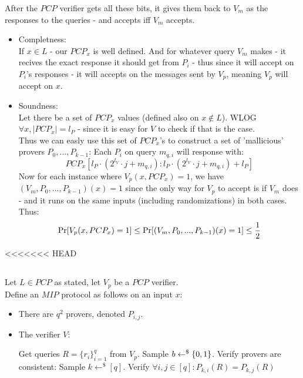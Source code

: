 After the $PCP$ verifier gets all these bits,
it gives them back to $V_m$ as the responses to the queries -
and accepts iff $V_m$ accepts.\\

\begin{itemize}
	\item Completness:\\
	If $x\in L$ - our $PCP_x$ is well defined.
	And for whatever query $V_m$ makes - it recives the exact
	response it should get from $P_i$ - thus since it will accept
	on $P_i$'s responses - it will accepts on the messages sent by $V_p$,
	meaning $V_p$ will accept on $x$.
	\item Soundness:\\
	Let there be a set of $PCP_x$ values (defined also on $x\notin L$).
	WLOG $\forall x,|PCP_x|=l_P$ - since it is easy for $V$ to check if that is the case.\\
	Thus we can easly use this set of $PCP_x$'s to
	construct a set of 'mallicious' provers $P_0,...,P_{k-1}$:
	Each $P_i$ on query $m_{q,i}$ will response with:
	\[
		PCP_x[l_P\cdot(2^{l_V}\cdot j+m_{q,i}):l_P\cdot(2^{l_V}\cdot j+m_{q,i})+l_P]
	\]
	Now for each instance where $V_p(x,PCP_x)=1$, we have
	$(V_m,P_0,...,P_{k-1})(x)=1$ since the only way for $V_p$
	to accept is if $V_m$ does - and it runs on the same inputs (including randomizations) in both cases.\\
	Thus:
	\[
		\operatorname*{Pr}[V_p(x,PCP_x)=1]\leq \operatorname*{Pr}[(V_m,P_0,...,P_{k-1})(x)=1]\leq\frac{1}{2}
	\] 
\end{itemize}

<<<<<<< HEAD
\subsection{}
Let $L\in PCP$ as stated, let $V_p$ be a $PCP$ verifier.\\
Define an $MIP$ protocol as follows on an input $x$:
\begin{itemize}
	\item There are $q^2$ provers, denoted $P_{i,j}$.
	\item The verifier $V$:\\
	\begin{algorithmic}
		\State Get queries $R=\{r_i\}_{i=1}^q$ from $V_p$.
		\State Sample $b\leftarrow^\$\{0,1\}$.
			\State Verify provers are consistent:
			\State Sample $k\leftarrow^\$[q]$.
			\State Verify $\forall i,j\in[q]:P_{k,i}(R)=P_{k,j}(R)$
		\Else
			\State 
		\EndIf 
	\end{algorithmic}
\end{itemize}

